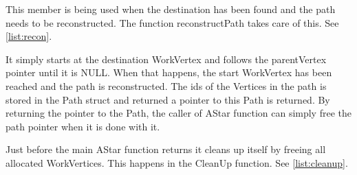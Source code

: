  This member is being used when the destination has been found and the path needs to be reconstructed. The function reconstructPath takes care of this. See \cref{list:recon}.



It simply starts at the destination WorkVertex and follows the parentVertex pointer until it is NULL. When that happens, the start WorkVertex has been reached and the path is reconstructed. The ids of the Vertices in the path is stored in the Path struct and returned a pointer to this Path is returned. By returning the pointer to the Path, the caller of AStar function can simply free the path pointer when it is done with it.

Just before the main AStar function returns it cleans up itself by freeing all allocated WorkVertices. This happens in the CleanUp function. See \cref{list:cleanup}.

